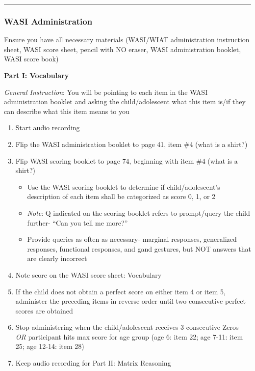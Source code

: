 \documentclass[
]{book}
\providecommand{\tightlist}{%
  \setlength{\itemsep}{0pt}\setlength{\parskip}{0pt}}
\begin{document}
\begin{center}\rule{0.5\linewidth}{0.5pt}\end{center}

\hypertarget{wasi-administration}{%
\subsubsection{WASI Administration}\label{wasi-administration}}

Ensure you have all necessary materials (WASI/WIAT administration instruction sheet, WASI score sheet, pencil with NO eraser, WASI administration booklet, WASI score book)

\textbf{Part I: Vocabulary}

\emph{General Instruction}: You will be pointing to each item in the WASI administration booklet and asking the child/adolescent what this item is/if they can describe what this item means to you

\begin{enumerate}
\def\labelenumi{\arabic{enumi}.}
\tightlist
\item
  Start audio recording
\item
  Flip the WASI administration booklet to page 41, item \#4 (what is a shirt?)
\item
  Flip WASI scoring booklet to page 74, beginning with item \#4 (what is a shirt?)

  \begin{itemize}
  \tightlist
  \item
    Use the WASI scoring booklet to determine if child/adolescent's description of each item shall be categorized as score 0, 1, or 2
  \item
    \emph{Note}: Q indicated on the scoring booklet refers to prompt/query the child further- ``Can you tell me more?''
  \item
    Provide queries as often as necessary- marginal responses, generalized responses, functional responses, and gand gestures, but NOT answers that are clearly incorrect
  \end{itemize}
\item
  Note score on the WASI score sheet: Vocabulary
\item
  If the child does not obtain a perfect score on either item 4 or item 5, administer the preceding items in reverse order until two consecutive perfect scores are obtained
\item
  Stop administering when the child/adolescent receives 3 consecutive Zeros \emph{OR} participant hits max score for age group (age 6: item 22; age 7-11: item 25; age 12-14: item 28)
\item
  Keep audio recording for Part II: Matrix Reasoning
\end{enumerate}
\end{document}
